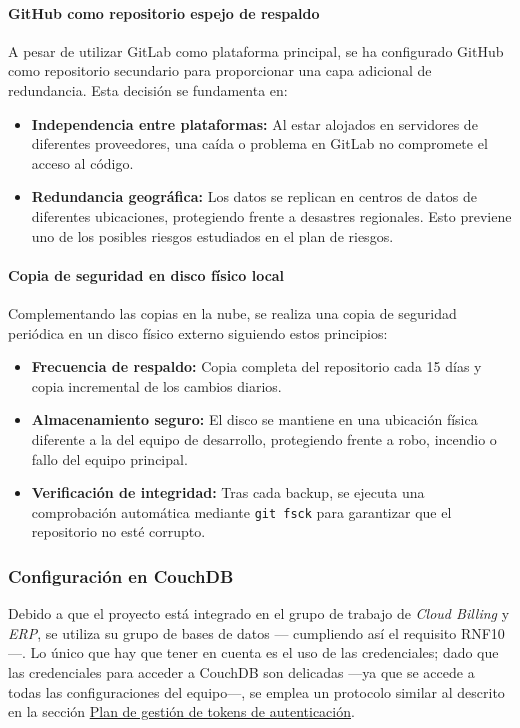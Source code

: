 \paragraph{GitHub como repositorio espejo de respaldo}
A pesar de utilizar GitLab como plataforma principal, se ha configurado GitHub como repositorio
secundario para proporcionar una capa adicional de redundancia. Esta decisión se fundamenta en:

\begin{itemize}
    \item \textbf{Independencia entre plataformas:} Al estar alojados en servidores de diferentes
          proveedores, una caída o problema en GitLab no compromete el acceso al código.

    \item \textbf{Redundancia geográfica:} Los datos se replican en centros de datos de diferentes
          ubicaciones, protegiendo frente a desastres regionales. Esto previene uno de los posibles riesgos estudiados en el plan de riesgos.
\end{itemize}

\paragraph{Copia de seguridad en disco físico local}
Complementando las copias en la nube, se realiza una copia de seguridad periódica en un disco físico
externo siguiendo estos principios: 

\begin{itemize}
    \item \textbf{Frecuencia de respaldo:} Copia completa del repositorio cada 15 días y copia
          incremental de los cambios diarios.

    \item \textbf{Almacenamiento seguro:} El disco se mantiene en una ubicación física diferente a la
          del equipo de desarrollo, protegiendo frente a robo, incendio o fallo del equipo principal.

    \item \textbf{Verificación de integridad:} Tras cada backup, se ejecuta una comprobación automática
          mediante \texttt{git fsck} para garantizar que el repositorio no esté corrupto.
\end{itemize}

\subsubsection{Configuración en CouchDB}
Debido a que el proyecto está integrado en el grupo de trabajo de \textit{Cloud Billing} y \textit{ERP}, se utiliza su grupo de bases de datos --- cumpliendo así el requisito RNF10 ---.
Lo único que hay que tener en cuenta es el uso de las credenciales; dado que las credenciales para acceder a CouchDB
son delicadas ---ya que se accede a todas las configuraciones del equipo---, se emplea un protocolo similar al descrito en la
sección \hyperref[iteraciones:gestion-tokens]{Plan de gestión de tokens de autenticación}.

